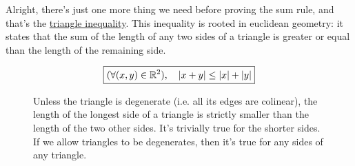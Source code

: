 \documentclass[solutions.tex]{subfiles}
\begin{document}
Alright, there's just one more thing we need before proving
the sum rule, and that's the
\href{https://en.wikipedia.org/wiki/Triangle\_inequality}
{triangle inequality}. This inequality is rooted in euclidean geometry:
it states that the sum of the length of any two sides of a triangle is greater
or equal than the length of the remaining side.

\begin{theorem}
\begin{equation*} \begin{aligned}
	\boxed{(\forall (x,y)\in\mathbb{R}^2),\quad \lvert x+y \rvert\le \lvert x \rvert+\lvert y \rvert}
\end{aligned} \end{equation*}
\end{theorem}

\begin{figure}[H]
	\centering
	\caption{Unless the triangle is degenerate (i.e. all its
	edges are colinear), the length of the longest side of a triangle is
	strictly smaller than the length of the two other sides. It's trivially
	true for the shorter sides. If we allow triangles to be degenerates,
	then it's true for any sides of any triangle.}
\end{figure}
\end{document}
